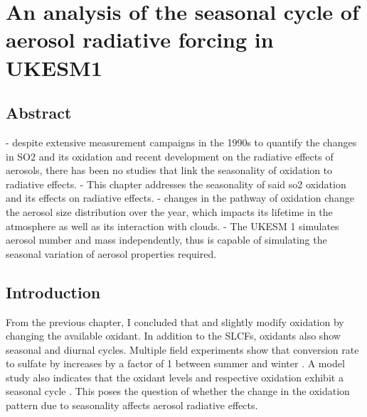 \chapter{An analysis of the seasonal cycle of aerosol radiative forcing in UKESM1}

\ifpdf
    \graphicspath{{Chapter4/Figs/Raster/}{Chapter4/Figs/PDF/}{Chapter4/Figs/}}
\else
    \graphicspath{{Chapter4/Figs/Vector/}{Chapter4/Figs/}}
\fi


\section*{Abstract}

- despite extensive measurement campaigns in the 1990s to quantify the changes in SO2 and its oxidation and recent development on the radiative effects of aerosols, there has been no studies that link the seasonality of oxidation to radiative effects.
- This chapter addresses the seasonality of said so2 oxidation and its effects on radiative effects.
- changes in the pathway of oxidation change the aerosol size distribution over the year, which impacts its lifetime in the atmosphere as well as its interaction with clouds.
- The UKESM 1 simulates aerosol number and mass independently, thus is capable of simulating the seasonal variation of aerosol properties required.

\section{Introduction}

From the previous chapter, I concluded that  and  slightly modify  oxidation by changing the available oxidant. In addition to the SLCFs, oxidants also show seasonal and diurnal cycles. Multiple field experiments show that  conversion rate to sulfate by  increases by a factor of 1 between summer and winter \cite{meagherSeasonalVariationAtmospheric1983}. A model study also indicates that the oxidant levels and respective oxidation exhibit a seasonal cycle \cite{feichterSimulationTroposphericSulfur1996}. This poses the question of whether the change in the oxidation pattern due to seasonality affects aerosol radiative effects.


